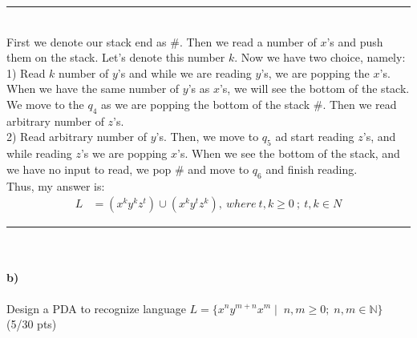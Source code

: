 \documentclass[a4paper,12pt]{article}
\newcommand{\HRule}{\rule{\linewidth}{1mm}}
\begin{document}
\HRule\\
First we denote our stack end as $\#$. Then we read a number of $x$'s and push them on the stack. Let's denote this number $k$. Now we have two choice, namely:\\
1) Read $k$ number of $y$'s and while we are reading $y$'s, we are popping the $x$'s. When we have the same number of $y$'s as $x$'s, we will see the bottom of the stack. We move to the $q_4$ as we are popping the bottom of the stack $\#$. Then we read arbitrary number of $z$'s.
\\
2) Read arbitrary number of $y$'s. Then, we move to $q_5$ ad start reading $z$'s, and while reading $z$'s we are popping $x$'s. When we see the bottom of the stack, and we have no input to read, we pop $\#$ and move to $q_6$ and finish reading.
\\
Thus, my answer is:\\
\begin{align*}
L&= (x^k y^k z^t) \cup (x^k y^t z^k),\ where\ t,k \geq 0\ ;\ t,k \in N
\end{align*}
\HRule\\


\paragraph{b)} 
Design a PDA to recognize language $ L=\{x^n y^{m+n} x^m \mid \; n,m \geq 0; \; n,m \in \mathbb{N}  \} $  \hfill \small{(5/30 pts)} \\
\end{document}
